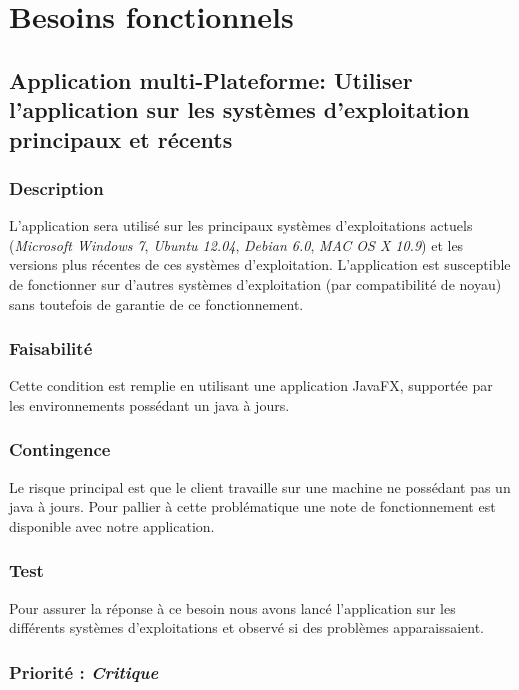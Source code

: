 \section{Besoins fonctionnels}\label{besoins_fonctionnels}

\subsection{Application multi-Plateforme: Utiliser l’application sur les systèmes d’exploitation principaux et récents}\label{systems}

\subsubsection{Description}

L’application sera utilisé sur les principaux systèmes d’exploitations actuels (\textit{Microsoft Windows 7}, \textit{Ubuntu 12.04}, \textit{Debian 6.0}, \textit{MAC OS X 10.9}) et les versions plus récentes de ces systèmes d’exploitation.
L’application est susceptible de fonctionner sur d’autres systèmes d’exploitation (par compatibilité de noyau) sans toutefois de garantie de ce fonctionnement.

\subsubsection{Faisabilité}

Cette condition est remplie en utilisant une application JavaFX, supportée par les environnements possédant un java à jours.

\subsubsection{Contingence}

Le risque principal est que le client travaille sur une machine ne possédant pas un java à jours. Pour pallier à cette problématique une note de fonctionnement est disponible avec notre application.

\subsubsection{Test}

Pour assurer la réponse à ce besoin nous avons lancé l’application sur les différents systèmes d’exploitations et observé si des problèmes apparaissaient.

\subsubsection{Priorité : \textit{Critique}}

